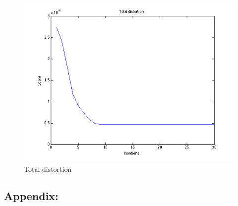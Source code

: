 \documentclass[a4paper]{article}
\begin{document}
	\begin{figure}[H]
		\centering
			\includegraphics[scale=.55]{images/total_distortion.png}
		\caption{Total distortion}
	\end{figure}
	
\newpage
\subsection*{Appendix:}
	
	
	
	
	
	
	
	
	
	
\end{document}
